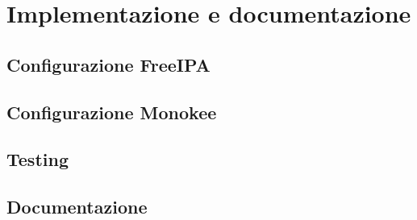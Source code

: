 
\chapter{Implementazione e documentazione}
\label{cap:implementazione-documentazione}


\section{Configurazione FreeIPA}

\section{Configurazione Monokee}
\section{Testing}

\section{Documentazione}
